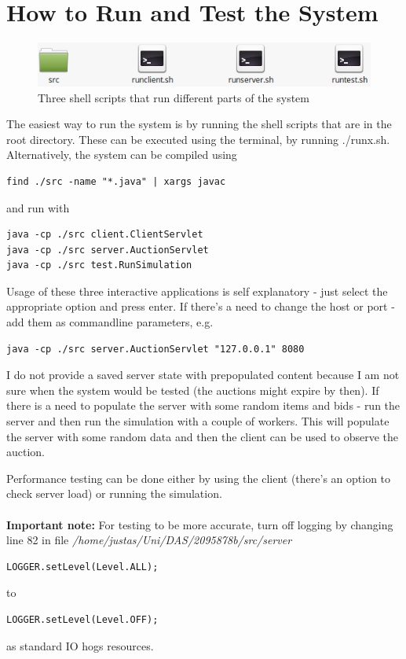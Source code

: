 \documentclass[10pt]{article}
\begin{document}
\section{How to Run and Test the System}
\begin{figure}[h]
\begin{center}
\includegraphics[scale=0.6]{runopt.png}
\caption{Three shell scripts that run different parts of the system}
\end{center}
\end{figure}
The easiest way to run the system is by running the shell scripts that are in the root directory. These can be executed using the terminal, by running ./runx.sh. Alternatively, the system can be compiled using 
\begin{verbatim}
find ./src -name "*.java" | xargs javac
\end{verbatim}
and run with 
\begin{verbatim}
java -cp ./src client.ClientServlet
java -cp ./src server.AuctionServlet
java -cp ./src test.RunSimulation
\end{verbatim}
\par
Usage of these three interactive applications is self explanatory - just select the appropriate option and press enter. If there's a need to change the host or port - add them as commandline parameters, e.g.
\begin{verbatim}
java -cp ./src server.AuctionServlet "127.0.0.1" 8080
\end{verbatim}
\par
I do not provide a saved server state with prepopulated content because I am not sure when the system would be tested (the auctions might expire by then). If there is a need to populate the server with some random items and bids - run the server and then run the simulation with a couple of workers. This will populate the server with some random data and then the client can be used to observe the auction.
\par
Performance testing can be done either by using the client (there's an option to check server load) or running the simulation.\\ \\
\textbf{Important note:} For testing to be more accurate, turn off logging by changing line 82 in file \textit{/home/justas/Uni/DAS/2095878b/src/server}
\begin{verbatim}
LOGGER.setLevel(Level.ALL);
\end{verbatim}
to
\begin{verbatim}
LOGGER.setLevel(Level.OFF);
\end{verbatim}
as standard IO hogs resources.
\end{document}
